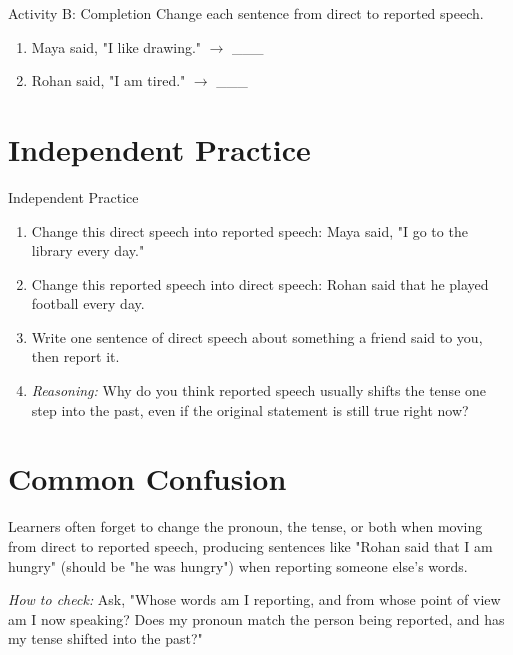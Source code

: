\begin{activitybox}{Activity B: Completion}
Change each sentence from direct to reported speech.
\begin{enumerate}
    \item Maya said, "I like drawing." $\rightarrow$ \_\_\_
    \item Rohan said, "I am tired." $\rightarrow$ \_\_\_
\end{enumerate}
\end{activitybox}

\section{Independent Practice}
\begin{activitybox}{Independent Practice}
\begin{enumerate}
    \item Change this direct speech into reported speech: Maya said, "I go to the library every day."
    \item Change this reported speech into direct speech: Rohan said that he played football every day.
    \item Write one sentence of direct speech about something a friend said to you, then report it.
    \item \textit{Reasoning:} Why do you think reported speech usually shifts the tense one step into the past, even if the original statement is still true right now?
\end{enumerate}
\end{activitybox}

\section{Common Confusion}
\begin{warningbox}
Learners often forget to change the pronoun, the tense, or both when moving from direct to reported speech, producing sentences like "Rohan said that I am hungry" (should be "he was hungry") when reporting someone else's words.

\textit{How to check:} Ask, "Whose words am I reporting, and from whose point of view am I now speaking? Does my pronoun match the person being reported, and has my tense shifted into the past?"
\end{warningbox}

